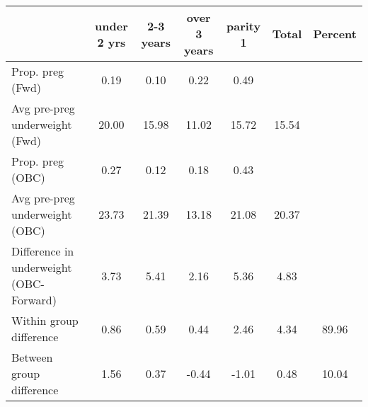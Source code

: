 \begin{tabular}{l*{6}{c}}
\toprule
            &\multicolumn{1}{c}{under 2 yrs}&\multicolumn{1}{c}{2-3 years}&\multicolumn{1}{c}{over 3 years}&\multicolumn{1}{c}{parity 1}&\multicolumn{1}{c}{Total}&\multicolumn{1}{c}{Percent}\\
\midrule
\midrule
Prop. preg (Fwd)&        0.19&        0.10&        0.22&        0.49&            &            \\
Avg pre-preg underweight (Fwd)&       20.00&       15.98&       11.02&       15.72&       15.54&            \\
Prop. preg (OBC)&        0.27&        0.12&        0.18&        0.43&            &            \\
Avg pre-preg underweight (OBC)&       23.73&       21.39&       13.18&       21.08&       20.37&            \\
Difference in underweight (OBC-Forward)&        3.73&        5.41&        2.16&        5.36&        4.83&            \\
Within group difference&        0.86&        0.59&        0.44&        2.46&        4.34&       89.96\\
Between group difference&        1.56&        0.37&       -0.44&       -1.01&        0.48&       10.04\\
\bottomrule
\end{tabular}
